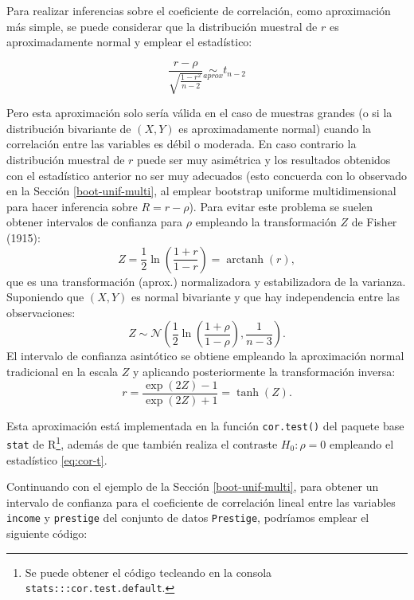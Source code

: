 \documentclass[]{book}
\newenvironment{Shaded}{\begin{snugshade}}{\end{snugshade}}
\newcommand{\KeywordTok}[1]{\textcolor[rgb]{0.13,0.29,0.53}{\textbf{#1}}}
\newcommand{\DataTypeTok}[1]{\textcolor[rgb]{0.13,0.29,0.53}{#1}}
\newcommand{\StringTok}[1]{\textcolor[rgb]{0.31,0.60,0.02}{#1}}
\newcommand{\CommentTok}[1]{\textcolor[rgb]{0.56,0.35,0.01}{\textit{#1}}}
\newcommand{\OperatorTok}[1]{\textcolor[rgb]{0.81,0.36,0.00}{\textbf{#1}}}
\newcommand{\NormalTok}[1]{#1}
\theoremstyle{break}
\theoremstyle{definition}
\theoremstyle{definition}
\theoremstyle{definition}
\theoremstyle{remark}
\begin{document}
Para realizar inferencias sobre el coeficiente de correlación, como
aproximación más simple, se puede considerar que la distribución
muestral de \(r\) es aproximadamente normal y emplear el estadístico:

\begin{equation} 
\frac{r -\rho}{\sqrt{\frac{1 - r^2}{n - 2}}} \underset{aprox}{\sim } t_{n-2}
\label{eq:cor-t}
\end{equation}

Pero esta aproximación solo sería válida en el caso de muestras grandes
(o si la distribución bivariante de \((X, Y)\) es aproximadamente
normal) cuando la correlación entre las variables es débil o moderada.
En caso contrario la distribución muestral de \(r\) puede ser muy
asimétrica y los resultados obtenidos con el estadístico anterior no ser
muy adecuados (esto concuerda con lo observado en la Sección
\ref{boot-unif-multi}, al emplear bootstrap uniforme multidimensional
para hacer inferencia sobre \(R = r -\rho\)). Para evitar este problema
se suelen obtener intervalos de confianza para \(\rho\) empleando la
transformación \(Z\) de Fisher (1915):
\[Z = \frac{1}{2}\ln \left( \frac{1+r}{1-r} \right) = \operatorname{arctanh}(r),\]
que es una transformación (aprox.) normalizadora y estabilizadora de la
varianza. Suponiendo que \((X, Y)\) es normal bivariante y que hay
independencia entre las observaciones:
\[Z \sim \mathcal{N}\left( \frac{1}{2}\ln \left( \frac{1+\rho}{1-\rho} \right), \frac{1}{n-3} \right).\]
El intervalo de confianza asintótico se obtiene empleando la
aproximación normal tradicional en la escala \(Z\) y aplicando
posteriormente la transformación inversa:
\[r = \frac{\exp(2Z)-1}{\exp(2Z)+1} = \operatorname{tanh}(Z).\]

Esta aproximación está implementada en la función \texttt{cor.test()}
del paquete base \texttt{stat} de R\footnote{Se puede obtener el código
  tecleando en la consola \texttt{stats:::cor.test.default}.}, además de
que también realiza el contraste \(H_0: \rho = 0\) empleando el
estadístico \eqref{eq:cor-t}.

Continuando con el ejemplo de la Sección \ref{boot-unif-multi}, para
obtener un intervalo de confianza para el coeficiente de correlación
lineal entre las variables \texttt{income} y \texttt{prestige} del
conjunto de datos \texttt{Prestige}, podríamos emplear el siguiente
código:

\begin{Shaded}
\end{Shaded}
\end{document}
